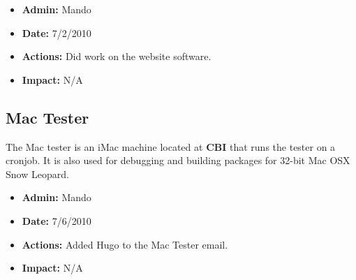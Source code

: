 \documentclass[12pt]{article}
\begin{document}
\begin{itemize}
\item[] {\bf Admin:} Mando
\item[] {\bf Date:} 7/2/2010
\item[] {\bf Actions:} Did work on the website software. 
\item[] {\bf Impact:} N/A
\end{itemize}


\subsection*{Mac Tester}

The Mac tester is an iMac machine located at {\bf CBI} that runs the tester on a cronjob. It is also used for debugging and building packages for 32-bit Mac OSX Snow Leopard.

\begin{itemize}
\item[] {\bf Admin:} Mando
\item[] {\bf Date:} 7/6/2010
\item[] {\bf Actions:} Added Hugo to the Mac Tester email.
\item[] {\bf Impact:} N/A
\end{itemize}
\end{document}
